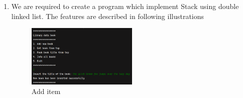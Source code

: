 \documentclass[12pt,titlepage]{article}
\begin{document}
\begin{enumerate}
{\begin{verbatim}
                            System.out.print("Data: ");
                            int data = scanner.nextInt();
                            int index = list.search(data);
                            if (index == -1) {
                                System.out.println("No data was found on the list");
                                break;
                            }
                            System.out.printf("Data was found on index: %s\n", index);
                            break;
                        }
                        case 9: {
                            list.bubbleSort();
                            break;
                        }
                        case 10: {
                            System.out.println("Exiting...");
                            break;
                        }
                        default: {
                            System.out.println("Invalid input");
                            return;
                        }
                    }
                }

            }

            static void showMenu() {
                System.out.println("=========================================");
                System.out.println("Data manipulation with Double Linked List");
                System.out.println("=========================================");
                System.out.println("1. Add First");
                System.out.println("2. Add Tail");
                System.out.println("3. Add Data in nth index");
                System.out.println("4. Remove First");
                System.out.println("5. Remove Last");
                System.out.println("6. Remove data by index");
                System.out.println("7. Print");
                System.out.println("8. Search Data");
                System.out.println("9. Sort Data");
                System.out.println("10. Exit");
                System.out.println("=========================================");
                System.out.print("Choose menu: ");
            }
        }
        \end{verbatim}

    }

    \pagebreak

    \item {
        We are required to create a program which implement Stack using double linked list. The
        features are described in following illustrations

        \begin{figure}[h]
            \centering
            \includegraphics[width=0.5\textwidth]{./images/2-1.png}
            \caption{Add item}
        \end{figure}

}
\end{enumerate}
\end{document}
